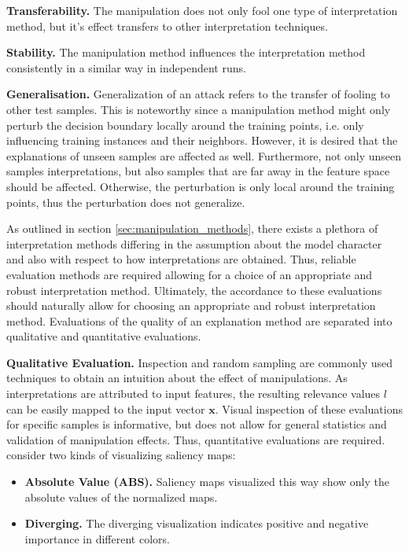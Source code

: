 \documentclass[sigconf]{acmart}
\newcommand{\mypar}[1]{\vspace{0.2cm}\noindent\textbf{#1}}
\begin{document}
\mypar{Transferability.} The manipulation does not only fool one type of interpretation method, but it's effect transfers to other interpretation techniques. 

\mypar{Stability.} The manipulation method influences the interpretation method consistently in a similar way in independent runs. 

\mypar{Generalisation.} Generalization of an attack refers to the transfer of fooling to other test samples. This is noteworthy since a manipulation method might only perturb the decision boundary locally around the training points, i.e. only influencing training instances and their neighbors. However, it is desired that the explanations of unseen samples are affected as well. Furthermore, not only unseen samples interpretations, but also samples that are far away in the feature space should be affected. 
Otherwise, the perturbation is only local around the training points, thus the perturbation does not generalize. 

\par\smallskip
As outlined in section \autoref{sec:manipulation_methods}, there exists a plethora of interpretation methods differing in the assumption about the model character and also with respect to how interpretations are obtained. Thus, reliable evaluation methods are required allowing for a choice of an appropriate and robust interpretation method. Ultimately, the accordance to these evaluations should naturally allow for choosing an appropriate and robust interpretation method.  
Evaluations of the quality of an explanation method are separated into qualitative and quantitative evaluations. 

\mypar{Qualitative Evaluation.} 
Inspection and random sampling are commonly used techniques to obtain an intuition about the effect of manipulations. 
As interpretations are attributed to input features, the resulting relevance values $l$ can be easily mapped to the input vector $\mathbf{x}$. Visual inspection of these evaluations for specific samples is informative, but does not allow for general statistics and validation of manipulation effects. Thus, quantitative evaluations are required. 
\cite{adebayo2018sanity} consider two kinds of visualizing saliency maps: 
\begin{itemize}
    \item \textbf{Absolute Value (ABS).} Saliency maps visualized this way show only the absolute values of the normalized maps.
    \item \textbf{Diverging. } The diverging visualization indicates positive and negative importance in different colors. 
\end{itemize}
\end{document}
